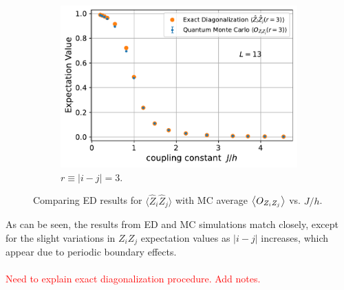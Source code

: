 \documentclass[../journal_main.tex]{subfiles}
\begin{document}
\begin{figure}[!htb]
\begin{subfigure}[b]{0.45\textwidth}
        \centering
        \includegraphics[width=\textwidth]{images/13_site/L=13_ZZ(r=3).pdf}
        \caption{$r \equiv |i-j| = 3$.}
    \end{subfigure}
    \caption{Comparing ED results for $\langle \hat{Z}_i \hat{Z}_j \rangle$ with MC average $\expval{O_{Z_i Z_j}}$ vs. $J/h$.}
    \label{expvalZZ_ED_vs_MC_13}
\end{figure}
\FloatBarrier
\hspace{-1.5em}As can be seen, the results from ED and MC simulations match closely, except for the slight variations in $Z_i Z_j$ expectation values as $|i-j|$ increases, which appear due to periodic boundary effects.~\\~\\
\textcolor{red}{Need to explain exact diagonalization procedure. Add notes.}
\end{document}
